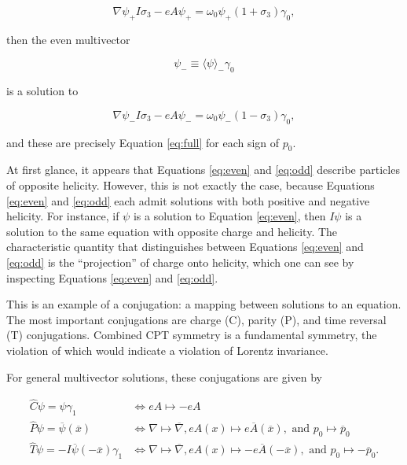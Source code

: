 \documentclass{article}
\begin{document}
  \begin{equation}
    \nabla \psi_+ I \sigma_3 - e A \psi_+ = \omega_0 \psi_+ (1 + \sigma_3) \gamma_0,\label{eq:even}
  \end{equation}

  then the even multivector 

  \begin{equation}
    \psi_- \equiv \langle \psi \rangle_- \gamma_0\label{eq:0decomposition}
  \end{equation} 

  is a solution to

  \begin{equation}
    \nabla \psi_- I \sigma_3 - e A \psi_- = \omega_0 \psi_- (1 - \sigma_3) \gamma_0,\label{eq:odd}
  \end{equation}

  and these are precisely Equation \ref{eq:full} for each sign of $p_0$.

  At first glance, it appears that Equations \ref{eq:even} and \ref{eq:odd} describe particles of opposite helicity. However, this is not exactly the case, because Equations \ref{eq:even} and \ref{eq:odd} each admit solutions with both positive and negative helicity. For instance, if $\psi$ is a solution to Equation \ref{eq:even}, then $I \psi$ is a solution to the same equation with opposite charge and helicity. The characteristic quantity that distinguishes between Equations \ref{eq:even} and \ref{eq:odd} is the ``projection'' of charge onto helicity, which one can see by inspecting Equations \ref{eq:even} and \ref{eq:odd}.

  This is an example of a conjugation: a mapping between solutions to an equation. The most important conjugations are charge (C), parity (P), and time reversal (T) conjugations. Combined CPT symmetry is a fundamental symmetry, the violation of which would indicate a violation of Lorentz invariance.

  For general multivector solutions, these conjugations are given by

  \begin{align}
    \hat C \psi = \psi \gamma_1 &\iff eA \mapsto - eA \label{eq:charge}\\
    \hat P \psi = \overline \psi(\overline x) &\iff \nabla \mapsto \overline \nabla, eA(x) \mapsto e\overline A(\overline x), \text{ and } p_0 \mapsto \overline p_0 \label{eq:parity}\\
    \hat T \psi = -I \overline \psi(-\overline x) \gamma_1 &\iff \nabla \mapsto \overline\nabla, eA(x) \mapsto -e\overline A(-\overline x), \text{ and } p_0 \mapsto - \overline p_0.\label{eq:time}
  \end{align}
\end{document}
